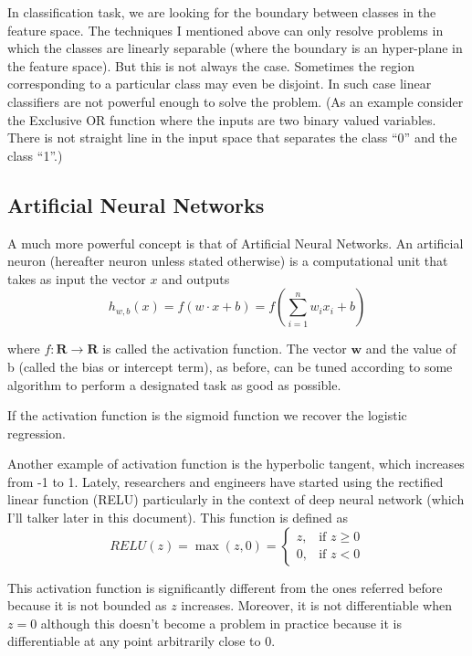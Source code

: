 In classification task, we are looking for the boundary between classes in the feature space. The techniques I mentioned above can only resolve problems in which the classes are linearly separable (where the boundary is an hyper-plane in the feature space). But this is not always the case. Sometimes the region corresponding to a particular class may even be disjoint. In such case linear classifiers are not powerful enough to solve the problem. (As an example consider the Exclusive OR function where the inputs are two binary valued variables. There is not straight line in the input space that separates the class “0” and the class “1”.)

\subsection{Artificial Neural Networks}
\label{subsec:ANN}

A much more powerful concept is that of Artificial Neural Networks. 
An artificial neuron (hereafter neuron unless stated otherwise) is a computational unit that takes as input the vector $x$ and outputs
\begin{equation}
h_{w,b} (x) = f\left( w \cdot x + b \right) = f \left( \sum_{i=1}^n w_i x_i + b  \right)
\end{equation}

where $f\colon \textbf{R} \rightarrow \textbf{R}$ is called the activation function. The vector $\textbf{w}$ and the value of b (called the bias or intercept term), as before, can be tuned according to some algorithm to perform a designated task as good as possible. 

If the activation function is the sigmoid function we recover the logistic regression.

Another example of activation function is the hyperbolic tangent, which increases from -1 to 1. 
Lately, researchers and engineers have started using the rectified linear function (RELU) particularly in the context of deep neural network (which I'll talker later in this document). This function is defined as
\begin{equation}
RELU(z)= \max(z,0) = 
\begin{cases}
    z,& \text{if } z\geq 0\\
    0,              & \text{if } z < 0
\end{cases}
\end{equation}

This activation function is significantly different from the ones referred before because it is not bounded as $z$ increases. Moreover, it is not differentiable when $z=0$ although this doesn't become a problem in practice because it is differentiable at any point arbitrarily close to 0.

